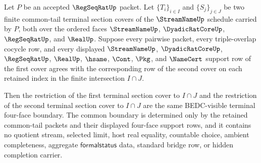 \begin{theorem}
\label{thm:regseqrat-common-tail-terminal-section-intersection-exactness}
Let $P$ be an accepted $\RegSeqRatUp$ packet. Let $\{T_i\}_{i \in I}$ and $\{S_j\}_{j \in J}$ be two finite common-tail terminal section covers of the $\StreamNameUp$ schedule carried by $P$, both over the ordered faces $\StreamNameUp$, $\DyadicRatCoreUp$, $\RegSeqRatUp$, and $\RealUp$. Suppose every pairwise packet, every triple-overlap cocycle row, and every displayed $\StreamNameUp$, $\DyadicRatCoreUp$, $\RegSeqRatUp$, $\RealUp$, $\hsame$, $\Cont$, $\Pkg$, and $\NameCert$ support row of the first cover agrees with the corresponding row of the second cover on each retained index in the finite intersection $I \cap J$.

Then the restriction of the first terminal section cover to $I \cap J$ and the restriction of the second terminal section cover to $I \cap J$ are the same BEDC-visible terminal four-face boundary. The common boundary is determined only by the retained common-tail packets and their displayed four-face support rows, and it contains no quotient stream, selected limit, host real equality, countable choice, ambient completeness, aggregate $\mathsf{formalstatus}$ data, standard bridge row, or hidden completion carrier.
\end{theorem}
